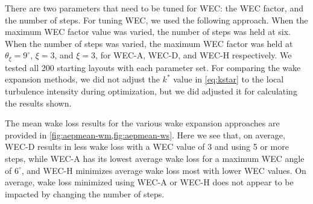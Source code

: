 \documentclass{jpconf}
\begin{document}
There are two parameters that need to be tuned for WEC: the WEC factor, and the number of steps. For tuning WEC, we used the following approach. When the maximum WEC factor value was varied, the number of steps was held at six. When the number of steps was varied, the maximum WEC factor was held at $\theta_\xi = 9 ^\circ$, $\xi=3$, and $\xi=3$, for WEC-A, WEC-D, and WEC-H respectively. We tested all 200 starting layouts with each parameter set. For comparing the wake expansion methods, we did not adjust the $k^*$ value in \cref{eq:kstar} to the local turbulence intensity during optimization, but we did  adjusted it for calculating the results shown.

The mean wake loss results for the various wake expansion approaches are provided in \cref{fig:aepmean-wm,fig:aepmean-ws}. Here we see that, on average, WEC-D results in less wake loss with a WEC value of 3 and using 5 or more steps, while WEC-A has its lowest average wake loss for a maximum WEC angle of $6^\circ$, and WEC-H minimizes average wake loss most with lower WEC values. On average, wake loss minimized using WEC-A or WEC-H does not appear to be impacted by changing the number of steps.
%
\end{document}

